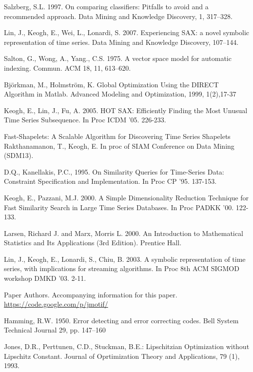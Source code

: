 \documentclass{llncs}
\begin{document}
\begin{thebibliography}{5}
Salzberg, S.L. 1997.
On comparing classifiers: Pitfalls to avoid and a recommended approach. 
Data Mining and Knowledge Discovery, 1, 317–328.

Lin, J., Keogh, E., Wei, L., Lonardi, S. 2007.
Experiencing SAX: a novel symbolic representation of time series.
Data Mining and Knowledge Discovery, 107--144.

Salton, G., Wong, A., Yang., C.S. 1975.
A vector space model for automatic indexing. 
Commun. ACM 18, 11, 613--620.

Björkman, M., Holmström, K.
Global Optimization Using the DIRECT Algorithm in Matlab.
Advanced Modeling and Optimization, 1999, 1(2),17-37

Keogh, E., Lin, J., Fu, A. 2005.
HOT SAX: Efficiently Finding the Most Unusual Time Series Subsequence. 
In Proc ICDM '05. 226-233.

Fast-Shapelets: A Scalable Algorithm for Discovering Time Series Shapelets
Rakthanamanon, T., Keogh, E.
In proc of SIAM Conference on Data Mining (SDM13).

D.Q., Kanellakis, P.C., 1995.
On Similarity Queries for Time-Series Data: Constraint Specification and Implementation. 
In Proc CP '95. 137-153.

Keogh, E., Pazzani, M.J. 2000.
A Simple Dimensionality Reduction Technique for Fast Similarity Search in Large Time Series
Databases. 
In Proc PADKK '00. 122-133.

Larsen, Richard J. and Marx, Morris L. 2000. 
An Introduction to Mathematical Statistics and Its Applications (3rd Edition).
Prentice Hall.

Lin, J., Keogh, E., Lonardi, S., Chiu, B. 2003.
A symbolic representation of time series, with implications for streaming algorithms. 
In Proc 8th ACM SIGMOD workshop DMKD '03. 2-11.

Paper Authors. 
Accompanying information for this paper. 
\url{https://code.google.com/p/jmotif/}

Hamming, R.W. 1950.
Error detecting and error correcting codes. 
Bell System Technical Journal 29, pp. 147--160

Jones, D.R., Perttunen, C.D., Stuckman, B.E.:
Lipschitzian Optimization without Lipschitz Constant.
Journal of Oprtimization Theory and Applications, 79 (1), 1993.


\end{thebibliography}
\end{document}
